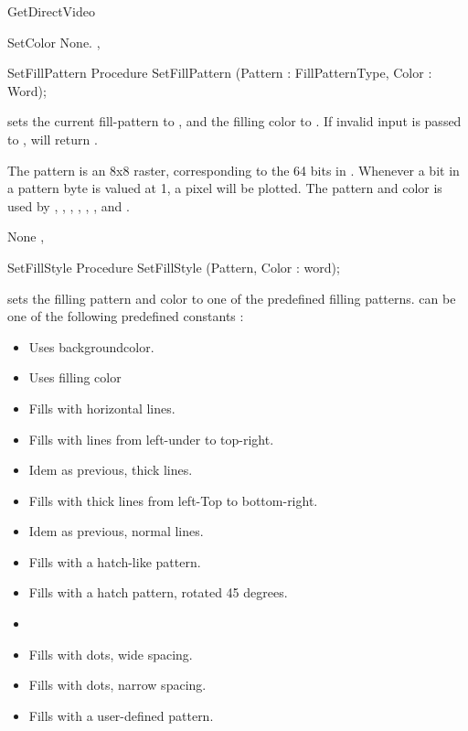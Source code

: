 \begin{function}{GetDirectVideo}
\begin{procedure}{SetColor}
\Errors
None.
\SeeAlso
{}, 
\end{procedure}
\begin{procedure}{SetFillPattern}
\Declaration
Procedure SetFillPattern (Pattern : FillPatternType, Color : Word);

\Description
{} sets the current fill-pattern to , and
the filling color to . If invalid input is passed to
,  will return .

The pattern is an 8x8 raster, corresponding to the 64 bits in
. Whenever a bit in a pattern byte is valued at 1,
a pixel will be plotted. The pattern and color is used by ,
, , , ,
, and .


\Errors
None
\SeeAlso
{}, 
\end{procedure}
\begin{procedure}{SetFillStyle}
\Declaration
Procedure SetFillStyle (Pattern, Color : word);

\Description
{} sets the filling pattern and color to one of the
predefined filling patterns.  can be one of the following predefined
constants :
\begin{itemize}
\item {} Uses backgroundcolor.
\item {} Uses filling color
\item {} Fills with horizontal lines.
\item {} Fills with lines from left-under to top-right.
\item {} Idem as previous, thick lines.
\item {} Fills with thick lines from left-Top to bottom-right.
\item {} Idem as previous, normal lines.
\item {}  Fills with a hatch-like pattern.
\item {} Fills with a hatch pattern, rotated 45 degrees.
\item {}
\item {} Fills with dots, wide spacing.
\item {} Fills with dots, narrow spacing.
\item {} Fills with a user-defined pattern.
\end{itemize}


\end{procedure}
\end{function}
